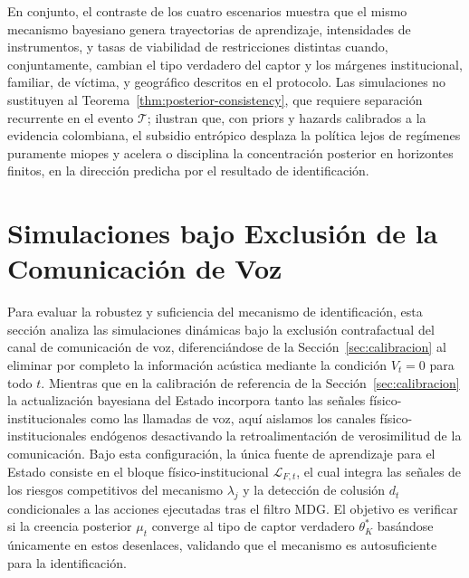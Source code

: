 \documentclass[review,authoryear,12pt]{elsarticle}
\theoremstyle{plain}
\theoremstyle{definition}
\newcommand{\1}{\mathbf{1}}
\begin{document}
En conjunto, el contraste de los cuatro escenarios muestra que el mismo mecanismo bayesiano genera trayectorias de aprendizaje, intensidades de instrumentos, y tasas de viabilidad de restricciones distintas cuando, conjuntamente, cambian el tipo verdadero del captor y los márgenes institucional, familiar, de víctima, y geográfico descritos en el protocolo. Las simulaciones no sustituyen al Teorema~\ref{thm:posterior-consistency}, que requiere separación recurrente en el evento $\mathcal{T}$; ilustran que, con priors y hazards calibrados a la evidencia colombiana, el subsidio entrópico desplaza la política lejos de regímenes puramente miopes y acelera o disciplina la concentración posterior en horizontes finitos, en la dirección predicha por el resultado de identificación.

\section{Simulaciones bajo Exclusión de la Comunicación de Voz}\label{sec:no-voice}

Para evaluar la robustez y suficiencia del mecanismo de identificación, esta sección analiza las simulaciones dinámicas bajo la exclusión contrafactual del canal de comunicación de voz, diferenciándose de la Sección~\ref{sec:calibracion} al eliminar por completo la información acústica mediante la condición $V_t = 0$ para todo $t$. Mientras que en la calibración de referencia de la Sección~\ref{sec:calibracion} la actualización bayesiana del Estado incorpora tanto las señales físico-institucionales como las llamadas de voz, aquí aislamos los canales físico-institucionales endógenos desactivando la retroalimentación de verosimilitud de la comunicación. Bajo esta configuración, la única fuente de aprendizaje para el Estado consiste en el bloque físico-institucional $\mathcal{L}_{F,t}$, el cual integra las señales de los riesgos competitivos del mecanismo $\lambda_j$ y la detección de colusión $d_t$ condicionales a las acciones ejecutadas tras el filtro MDG. El objetivo es verificar si la creencia posterior $\mu_t$ converge al tipo de captor verdadero $\theta_K^\ast$ basándose únicamente en estos desenlaces, validando que el mecanismo es autosuficiente para la identificación.
\end{document}
